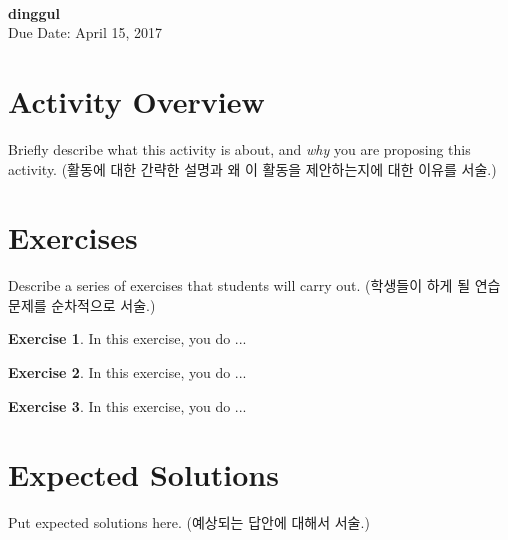 \documentclass[a4paper, 11pt]{article}
\theoremstyle{definition}
\newtheorem{exercise}{Exercise}
\begin{document}
 \\
         {\phantom{} \hfill \textbf{dinggul}} \\
         {\phantom{} \hfill Due Date: April 15, 2017} \\

\section{Activity Overview}

Briefly describe what this activity is about, and \emph{why} you are
proposing this activity. (활동에 대한 간략한 설명과 왜 이 활동을
제안하는지에 대한 이유를 서술.)

\section{Exercises}

Describe a series of exercises that students will carry out. (학생들이 하게
될 연습문제를 순차적으로 서술.)

\begin{exercise}

  In this exercise, you do ...

\end{exercise}

\begin{exercise}

  In this exercise, you do ...

\end{exercise}

\begin{exercise}

  In this exercise, you do ...

\end{exercise}

\section{Expected Solutions}

Put expected solutions here.
(예상되는 답안에 대해서 서술.)



\end{document}
